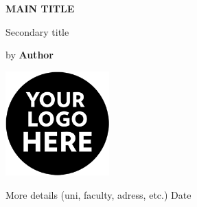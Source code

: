 \begin{titlepage}
    \begin{center}
        \vspace*{2cm}    
        \Huge
        \textbf{MAIN TITLE}
        
        \vspace{1.1cm}
        \LARGE
        Secondary title
        
        \vspace{2.1cm}
        by \textbf{Author}
            
        \vfill
            
            
        \vspace{1.8cm}
            
        \includegraphics[width=0.3\textwidth]{Images/logo-here.png}
        
        \vspace{0.5cm}
            
        \Large
        More details (uni, faculty, adress, etc.)
        Date

    \end{center}
\end{titlepage}